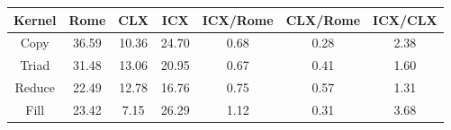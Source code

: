 \begin{tabular}{|c|c|c|c|c|c|c|}  \hline
Kernel&Rome&CLX&ICX & ICX/Rome & CLX/Rome & ICX/CLX \\ \hline 
Copy & 36.59 & 10.36 & 24.70  & 0.68 & 0.28 & 2.38 \\ \hline 
Triad & 31.48 & 13.06 & 20.95  & 0.67 & 0.41 & 1.60 \\ \hline 
Reduce & 22.49 & 12.78 & 16.76  & 0.75 & 0.57 & 1.31 \\ \hline 
Fill & 23.42 & 7.15 & 26.29  & 1.12 & 0.31 & 3.68 \\ \hline 
\end{tabular}
